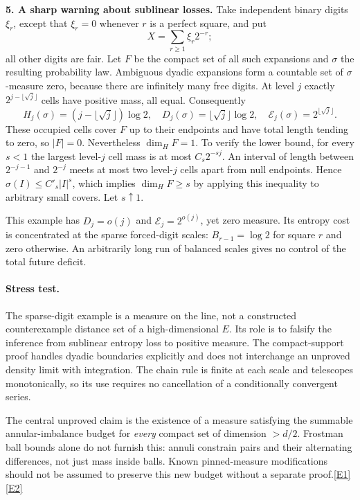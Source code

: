 \documentclass[11pt,a4paper]{article}
\newcommand{\eref}[2]{\hyperlink{extra:#1:#2}{[E#2]}}
\begin{document}
\textbf{5. A sharp warning about sublinear losses.}
Take independent binary digits $\xi_r$, except that $\xi_r=0$ whenever
$r$ is a perfect square, and put
\[
 X=\sum_{r\ge1}\xi_r2^{-r};
\]
all other digits are fair. Let $F$ be the compact set of all such expansions
and $\sigma$ the resulting probability law. Ambiguous dyadic expansions
form a countable set of $\sigma$-measure zero, because there are infinitely
many free digits. At level $j$ exactly $2^{j-\lfloor\sqrt j\rfloor}$ cells
have positive mass, all equal. Consequently
\begin{equation}\label{statement:sparse}
 H_j(\sigma)=(j-\lfloor\sqrt j\rfloor)\log2,
 \quad D_j(\sigma)=\lfloor\sqrt j\rfloor\log2,
 \quad \mathcal E_j(\sigma)=2^{\lfloor\sqrt j\rfloor}.
\end{equation}
These occupied cells cover $F$ up to their endpoints and have total length
tending to zero, so $|F|=0$. Nevertheless $\dim_H F=1$. To verify the lower
bound, for every $s<1$ the largest level-$j$ cell mass is at most
$C_s2^{-sj}$. An interval of length between $2^{-j-1}$ and $2^{-j}$ meets
at most two level-$j$ cells apart from null endpoints. Hence
$\sigma(I)\le C'_s|I|^s$, which implies $\dim_H F\ge s$ by applying this
inequality to arbitrary small covers. Let $s\uparrow1$.

This example has $D_j=o(j)$ and $\mathcal E_j=2^{o(j)}$, yet zero measure.
Its entropy cost is concentrated at the sparse forced-digit scales:
$B_{r-1}=\log2$ for square $r$ and zero otherwise. An arbitrarily long
run of balanced scales gives no control of the total future deficit.

\paragraph{Stress test.}
The sparse-digit example is a measure on the line, not a constructed
counterexample distance set of a high-dimensional $E$. Its role is to
falsify the inference from sublinear entropy loss to positive measure.
The compact-support proof handles dyadic boundaries explicitly and does
not interchange an unproved density limit with integration. The chain
rule is finite at each scale and telescopes monotonically, so its use
requires no cancellation of a conditionally convergent series.

The central unproved claim is the existence of a measure satisfying the
summable annular-imbalance budget for \emph{every} compact set of dimension
$>d/2$. Frostman ball bounds alone do not furnish this: annuli constrain
pairs and their alternating differences, not just mass inside balls.
Known pinned-measure modifications should not be assumed to preserve this
new budget without a separate proof.\eref{statement}{1}\eref{statement}{2}
\end{document}
